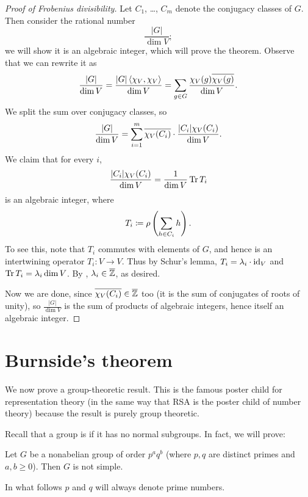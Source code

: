 \begin{proof}
	[Proof of Frobenius divisibility]
	Let $C_1$, \dots, $C_m$ denote the conjugacy classes of $G$.
	Then consider the rational number \[ \frac{|G|}{\dim V}; \]
	we will show it is an algebraic integer, which will prove the theorem.
	Observe that we can rewrite it as
	\[
		\frac{|G|}{\dim V}
		= \frac{|G| \left< \chi_V, \chi_V \right>}{\dim V}
		= \sum_{g \in G} \frac{\chi_V(g) \overline{\chi_V(g)}}{\dim V}.
	\]
	We split the sum over conjugacy classes, so
	\[
		\frac{|G|}{\dim V}
		=
		\sum_{i=1}^m \overline{\chi_V(C_i)} \cdot \frac{|C_i| \chi_V(C_i)}{\dim V}.
	\]
	We claim that for every $i$,
	\[ \frac{|C_i| \chi_V(C_i)}{\dim V}
		= \frac{1}{\dim V} \operatorname{Tr} T_i \]
	is an algebraic integer,
	where \[ T_i \coloneqq \rho\left(\sum_{h \in C_i} h\right). \]
	To see this, note that $T_i$ commutes with elements of $G$,
	and hence is an intertwining operator $T_i \colon V \to V$.
	Thus by Schur's lemma, $T_i = \lambda_i \cdot \mathrm{id}_V$
	and $\operatorname{Tr} T_i = \lambda_i \dim V$.
	By , $\lambda_i \in \overline{\mathbb Z}$, as desired.

	Now we are done, since $\overline{\chi_V(C_i)} \in \overline{\mathbb Z}$ too
	(it is the sum of conjugates of roots of unity),
	so $\frac{|G|}{\dim V}$ is the sum of products of algebraic integers,
	hence itself an algebraic integer.
\end{proof}

\section{Burnside's theorem}
We now prove a group-theoretic result.
This is the famous poster child for representation theory
(in the same way that RSA is the poster child of number theory)
because the result is purely group theoretic.

Recall that a group is  if it has no normal subgroups.
In fact, we will prove:
\begin{theorem}[Burnside]
	Let $G$ be a nonabelian group of order $p^a q^b$ (where $p,q$ are distinct primes and $a,b \ge 0$).
	Then $G$ is not simple.
\end{theorem}
In what follows $p$ and $q$ will always denote prime numbers.

